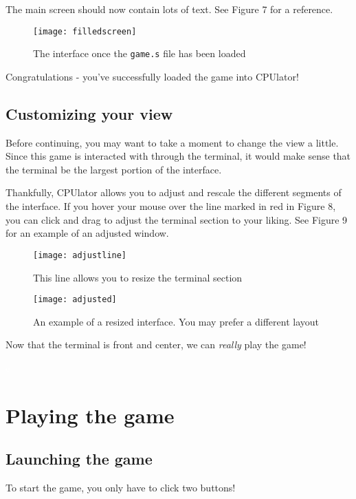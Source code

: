 \documentclass{article}
\begin{document}
The main screen should now contain lots of text. See Figure 7 for a reference.

\begin{figure}[ht]
    \centering
    \texttt{[image: filledscreen]}
    \caption{The interface once the \texttt{game.s} file has been loaded}
\end{figure}

Congratulations - you've successfully loaded the game into CPUlator!

\subsection{Customizing your view}

Before continuing, you may want to take a moment to change the view a little.
Since this game is interacted with through the terminal, it would make sense that
the terminal be the largest portion of the interface.

Thankfully, CPUlator allows you to adjust and rescale the different segments of
the interface. If you hover your mouse over the line marked in red in Figure 8,
you can click and drag to adjust the terminal section to your liking.
See Figure 9 for an example of an adjusted window.

\begin{figure}[ht]
    \centering
    \texttt{[image: adjustline]}
    \caption{This line allows you to resize the terminal section}
\end{figure}

\begin{figure}[ht]
    \centering
    \texttt{[image: adjusted]}
    \caption{An example of a resized interface. You may prefer a different layout}
\end{figure}

Now that the terminal is front and center, we can \textit{really} play the game!

\newpage
\textcolor{white}{e}
\newpage
\section{Playing the game}
\subsection{Launching the game}

To start the game, you only have to click two buttons!
\end{document}
